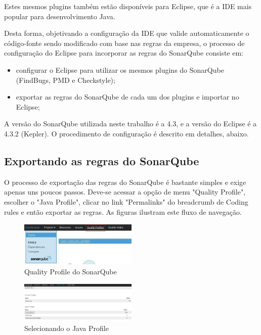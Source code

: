 \documentclass[12pt,journal,compsoc]{IEEEtran}
\begin{document}
Estes mesmos plugins também estão disponíveis para Eclipse, que é a IDE mais popular para desenvolvimento Java. 

Desta forma, objetivando a configuração da IDE que valide automaticamente o código-fonte sendo modificado com base nas regras da empresa, o processo de configuração do Eclipse para incorporar as regras do SonarQube consiste em:

\begin{itemize}
\item configurar o Eclipse para utilizar os mesmos plugins do SonarQube (FindBugs, PMD e Checkstyle); 
\item exportar as regras do SonarQube de cada um dos plugins e importar no Eclipse;
\end{itemize}

A versão do SonarQube utilizada neste trabalho é a 4.3, e a versão do Eclipse é a 4.3.2 (Kepler).
O procedimento de configuração é descrito em detalhes, abaixo.

\subsection{Exportando as regras do SonarQube}

O processo de exportação das regras do SonarQube é bastante simples e exige apenas uns poucos passos. Deve-se acessar a opção de menu "Quality Profile", escolher o "Java Profile", clicar no link "Permalinks" do breadcrumb de Coding rules e então exportar as regras. As figuras ilustram este fluxo de navegação.

\begin{figure}[ht!]
\centering
\includegraphics[width=0.5\textwidth]{img/sonar-step-01}
\caption{Quality Profile do SonarQube}
\label{sonar-step-01}
\end{figure} 

\begin{figure}[ht!]
\centering
\includegraphics[width=0.5\textwidth]{img/sonar-step-02}
\caption{Selecionando o Java Profile}
\label{sonar-step-02}
\end{figure} 
\end{document}
